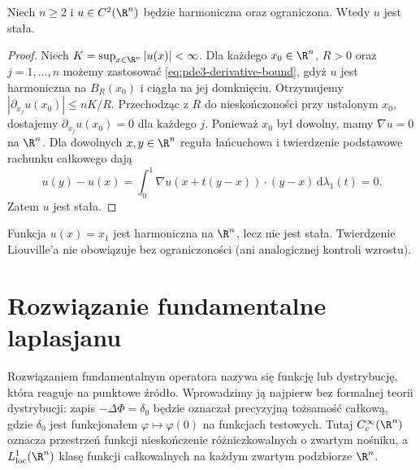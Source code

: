 \begin{wniosek}
\label{cor:pde3-liouville}
Niech $n\geq2$ i $u\in C^2(\R^n)$ będzie harmoniczna
oraz ograniczona. Wtedy $u$ jest stała.
\end{wniosek}
\begin{proof}
Niech $K=\sup_{x\in\R^n}|u(x)|<\infty$.
Dla każdego $x_0\in\R^n$, $R>0$ oraz $j=1,\ldots,n$
możemy zastosować \eqref{eq:pde3-derivative-bound},
gdyż $u$ jest harmoniczna na $B_R(x_0)$
i ciągła na jej domknięciu. Otrzymujemy
$|\partial_{x_j}u(x_0)|\leq nK/R$.
Przechodząc z $R$ do nieskończoności przy ustalonym $x_0$,
dostajemy $\partial_{x_j}u(x_0)=0$ dla każdego $j$.
Ponieważ $x_0$ był dowolny, mamy $\nabla u=0$ na $\R^n$.
Dla dowolnych $x,y\in\R^n$ reguła łańcuchowa
i twierdzenie podstawowe rachunku całkowego dają
\[
 u(y)-u(x)=\int_0^1
 \nabla u(x+t(y-x))\cdot(y-x)\,\mathrm d\lambda_1(t)=0.
\]
Zatem $u$ jest stała.
\end{proof}

\begin{kontrprzyklad}
Funkcja $u(x)=x_1$ jest harmoniczna na $\R^n$,
lecz nie jest stała. Twierdzenie Liouville'a nie
obowiązuje bez ograniczoności (ani analogicznej
kontroli wzrostu).
\end{kontrprzyklad}

\section{Rozwiązanie fundamentalne laplasjanu}
\label{sec:pde3-fundamental}

Rozwiązaniem fundamentalnym operatora nazywa się funkcję lub dystrybucję,
która reaguje na punktowe źródło. Wprowadzimy ją najpierw
bez formalnej teorii dystrybucji: zapis
$-\Delta\Phi=\delta_0$ będzie oznaczał precyzyjną
tożsamość całkową, gdzie $\delta_0$ jest funkcjonałem
$\varphi\mapsto\varphi(0)$ na funkcjach testowych.
Tutaj $C_c^\infty(\R^n)$ oznacza przestrzeń funkcji
nieskończenie różniczkowalnych o zwartym nośniku, a
$L^1_{\mathrm{loc}}(\R^n)$ klasę funkcji całkowalnych
na każdym zwartym podzbiorze $\R^n$.

